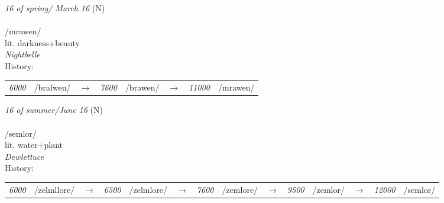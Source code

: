 \vspace{15pt}
\begin{nopagebreak}
 \textit{16 of spring/ March 16} (N)\\
\\
\noindent /mr{\textprimstress}awen/\\
\noindent lit. darkness+beauty\\
\noindent \textit{Nightbelle}\\


\noindent History:

\vspace{-0pt}
\hspace{40pt}
\begin{tabular}{ccc}
\textit{6000} & /bralwen/&$\rightarrow$ & \textit{7600} & /brawen/&$\rightarrow$ & \textit{11000} & /mrawen/& \\
\end{tabular}

\vspace{20pt}\hline

\end{nopagebreak}
\filbreak



\vspace{15pt}
\begin{nopagebreak}
 \textit{16 of summer/June 16} (N)\\
\\
\noindent /s{\textprimstress}emlor/\\
\noindent lit. water+plant\\
\noindent \textit{Dewlettuce}\\


\noindent History:

\vspace{-0pt}
\hspace{40pt}
\begin{tabular}{ccc}
\textit{6000} & /zelmllore/&$\rightarrow$ & \textit{6500} & /zelmlore/&$\rightarrow$ & \textit{7600} & /zemlore/&$\rightarrow$ & \textit{9500} & /zemlor/&$\rightarrow$ & \textit{12000} & /semlor/& \\
\end{tabular}

\vspace{20pt}\hline

\end{nopagebreak}
\filbreak



